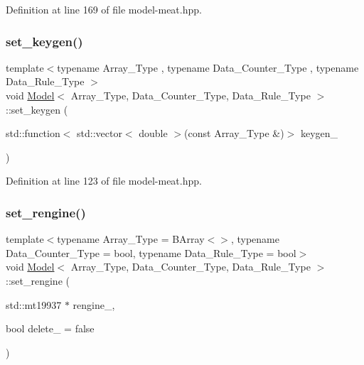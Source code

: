 Definition at line 169 of file model-\/meat.\+hpp.

\mbox{\label{class_model_add1847cdaf3f5bbde6c14efc2e4d16df}} 
\subsubsection{\texorpdfstring{set\+\_\+keygen()}{set\_keygen()}}
{\footnotesize\ttfamily template$<$typename Array\+\_\+\+Type , typename Data\+\_\+\+Counter\+\_\+\+Type , typename Data\+\_\+\+Rule\+\_\+\+Type $>$ \\
void \hyperlink{class_model}{Model}$<$ Array\+\_\+\+Type, Data\+\_\+\+Counter\+\_\+\+Type, Data\+\_\+\+Rule\+\_\+\+Type $>$\+::set\+\_\+keygen (\begin{DoxyParamCaption}\item[{std\+::function$<$ std\+::vector$<$ double $>$(const Array\+\_\+\+Type \&)$>$}]{keygen\+\_\+ }\end{DoxyParamCaption})\hspace{0.3cm}{\ttfamily [inline]}}



Definition at line 123 of file model-\/meat.\+hpp.

\mbox{\label{class_model_a1609f530936b0f575e8b0006c9c719c5}} 
\subsubsection{\texorpdfstring{set\+\_\+rengine()}{set\_rengine()}}
{\footnotesize\ttfamily template$<$typename Array\+\_\+\+Type = B\+Array$<$$>$, typename Data\+\_\+\+Counter\+\_\+\+Type = bool, typename Data\+\_\+\+Rule\+\_\+\+Type = bool$>$ \\
void \hyperlink{class_model}{Model}$<$ Array\+\_\+\+Type, Data\+\_\+\+Counter\+\_\+\+Type, Data\+\_\+\+Rule\+\_\+\+Type $>$\+::set\+\_\+rengine (\begin{DoxyParamCaption}\item[{std\+::mt19937 $\ast$}]{rengine\+\_\+,  }\item[{bool}]{delete\+\_\+ = {\ttfamily false} }\end{DoxyParamCaption})\hspace{0.3cm}{\ttfamily [inline]}}



